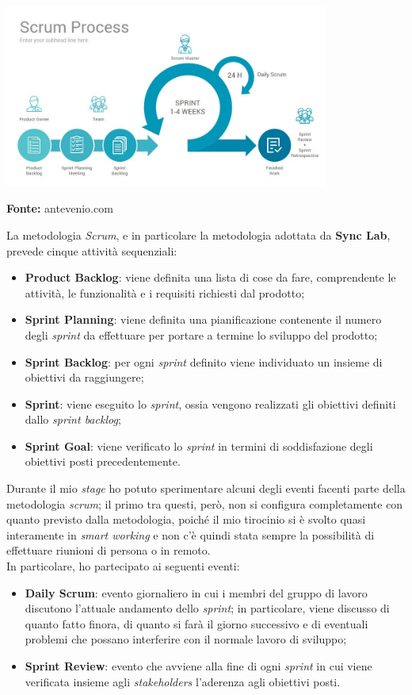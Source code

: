 \begin{minipage}{\linewidth}
  \centering
    \includegraphics[height=6cm]{immagini/scrum}
  \caption*{\textbf{Fonte:} antevenio.com}
\end{minipage}

La metodologia \textit{Scrum}, e in particolare la metodologia adottata da \textbf{Sync Lab}, prevede cinque attività sequenziali:
\begin{itemize}
  \item \textbf{Product Backlog}: viene definita una lista di cose da fare, comprendente le attività, le funzionalità e i requisiti richiesti dal prodotto;
  \item \textbf{Sprint Planning}: viene definita una pianificazione contenente il numero degli \textit{sprint} da effettuare per portare a termine lo sviluppo del prodotto;
  \item \textbf{Sprint Backlog}: per ogni \textit{sprint} definito viene individuato un insieme di obiettivi da raggiungere;
  \item \textbf{Sprint}: viene eseguito lo \textit{sprint}, ossia vengono realizzati gli obiettivi definiti dallo \textit{sprint backlog};
  \item \textbf{Sprint Goal}: viene verificato lo \textit{sprint} in termini di soddisfazione degli obiettivi posti precedentemente.
\end{itemize}

Durante il mio \textit{stage} ho potuto sperimentare alcuni degli eventi facenti parte della metodologia \textit{scrum}; il primo tra questi, però, non si configura completamente con quanto previsto dalla metodologia, poiché il mio tirocinio si è svolto quasi interamente in \textit{smart working} e non c'è quindi stata sempre la possibilità di effettuare riunioni di persona o in remoto. \\
In particolare, ho partecipato ai seguenti eventi:
\begin{itemize}
  \item \textbf{Daily Scrum}: evento giornaliero in cui i membri del gruppo di lavoro discutono l'attuale andamento dello \textit{sprint}; in particolare, viene discusso di quanto fatto finora, di quanto si farà il giorno successivo e di eventuali problemi che possano interferire con il normale lavoro di sviluppo;
  \item \textbf{Sprint Review}: evento che avviene alla fine di ogni \textit{sprint} in cui viene verificata insieme agli \textit{stakeholders} l'aderenza agli obiettivi posti.
\end{itemize}

